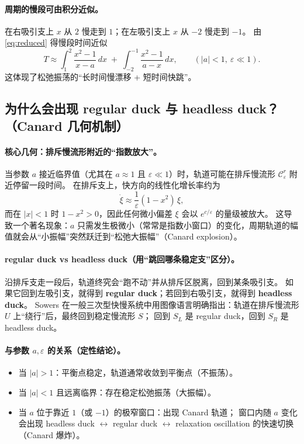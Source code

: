 	\paragraph{周期的慢段可由积分近似。}
	在右吸引支上 $x$ 从 $2$ 慢走到 $1$；在左吸引支上 $x$ 从 $-2$ 慢走到 $-1$。
	由 \eqref{eq:reduced} 得慢段时间近似
	\begin{equation}\label{eq:period}
		T \approx \int_{1}^{2}\frac{x^2-1}{x-a}\,dx \;+\; \int_{-2}^{-1}\frac{x^2-1}{a-x}\,dx,
		\qquad (|a|<1,\ \varepsilon\ll1).
	\end{equation}
	这体现了松弛振荡的“长时间慢漂移 + 短时间快跳”。
	
	\subsection{为什么会出现 regular duck 与 headless duck？（Canard 几何机制）}
	
	\paragraph{核心几何：排斥慢流形附近的“指数放大”。}
	当参数 $a$ 接近临界值（尤其在 $a\approx 1$ 且 $\varepsilon\ll1$）时，轨道可能在排斥慢流形 $\mathcal C_\varepsilon^{r}$ 附近停留一段时间。
	在排斥支上，快方向的线性化增长率约为
	\[
	\dot \xi \approx \frac{1}{\varepsilon}(1-x^2)\,\xi,
	\]
	而在 $|x|<1$ 时 $1-x^2>0$，因此任何微小偏差 $\xi$ 会以 $e^{c/\varepsilon}$ 的量级被放大。
	这导致一个著名现象：$a$ 只需发生极微小（常常是指数小窗口）的变化，周期轨道的幅值就会从“小振幅”突然跃迁到“松弛大振幅”（Canard explosion）。
	
	\paragraph{regular duck vs headless duck（用“跳回哪条稳定支”区分）。}
	沿排斥支走一段后，轨道终究会“跑不动”并从排斥区脱离，回到某条吸引支。
	如果它回到左吸引支，就得到 \textbf{regular duck}；若回到右吸引支，就得到 \textbf{headless duck}。
	Sowers 在一般三次型快慢系统中用图像语言明确指出：轨道在排斥慢流形 $U$ 上“绕行”后，最终回到稳定慢流形 $S$；
	回到 $S_L$ 是 regular duck，回到 $S_R$ 是 headless duck。%
	
	\paragraph{与参数 $a,\varepsilon$ 的关系（定性结论）。}
	\begin{itemize}
		\item 当 $|a|>1$：平衡点稳定，轨道通常收敛到平衡点（不振荡）。
		\item 当 $|a|<1$ 且远离临界：存在稳定松弛振荡（大振幅）。
		\item 当 $a$ 位于靠近 $1$（或 $-1$）的极窄窗口：出现 Canard 轨道；
		窗口内随 $a$ 变化会出现 headless duck $\leftrightarrow$ regular duck $\leftrightarrow$ relaxation oscillation 的快速切换（Canard 爆炸）。
	\end{itemize}
	
